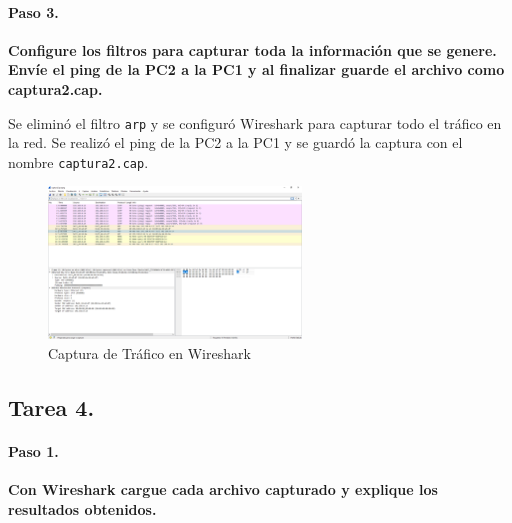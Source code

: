     \paragraph{Paso 3.}
        \textbf{Configure los filtros para capturar toda la información que se genere. Envíe el ping de la PC2 a la PC1 y al finalizar guarde el archivo como captura2.cap.}

        Se eliminó el filtro \texttt{arp} y se configuró Wireshark para capturar todo el tráfico en la red. Se realizó el ping de la PC2 a la PC1 y se guardó la captura con el nombre \texttt{captura2.cap}.

        \begin{figure}[H]
            \centering
            \includegraphics[width=0.6\textwidth]{img/wireshark_datos.PNG}
            \caption{Captura de Tráfico en Wireshark}
            \label{fig:wireshark_datos}
        \end{figure}
    \subsection{Tarea 4.}
        \paragraph{Paso 1.}
        \textbf{Con Wireshark cargue cada archivo capturado y explique los resultados obtenidos.}

